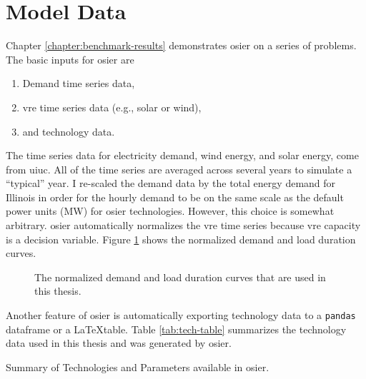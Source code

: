 \section{Model Data}

Chapter \ref{chapter:benchmark-results} demonstrates \ac{osier} on a 
series of problems. The basic inputs for \ac{osier} are
\begin{enumerate}
    \item Demand time series data,
    \item \ac{vre} time series data (e.g., solar or wind),
    \item and technology data.
\end{enumerate}
\noindent
The time series data for electricity demand, wind energy, and solar energy, come from \ac{uiuc}. All of the time series are averaged across several years to simulate a ``typical'' year. I re-scaled the demand data by the total energy demand for Illinois in order for the hourly demand to be on the same scale as the default power units (MW) for \ac{osier} technologies. However, this choice is somewhat arbitrary. \ac{osier} automatically normalizes the \ac{vre} time series because \ac{vre} capacity is a decision variable. Figure \ref{fig:normalized_ldc} shows the normalized demand and load duration
curves.


 \begin{figure}[h]
  \centering
  \resizebox{1\columnwidth}{!}{}
  \caption{The normalized demand and load duration curves that are used in this thesis.}
  \label{fig:normalized_ldc}
\end{figure}

\noindent
Another feature of \ac{osier} is automatically exporting technology 
data to a \texttt{pandas} dataframe or a \LaTeX table. 
Table \ref{tab:tech-table} summarizes the technology data used in 
this thesis and was generated by \ac{osier}. 



\begin{sidewaystable}[!ht]
  \centering
  \caption{Summary of Technologies and Parameters available in \ac{osier}.}
  \label{tab:tech-table}
  \resizebox{\textheight}{!}{
  
  } %
\end{sidewaystable}